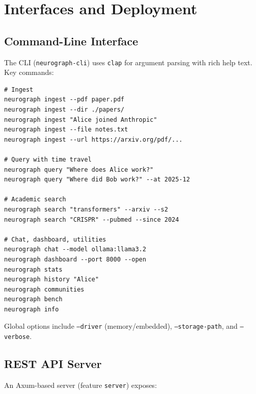 \documentclass[11pt,twocolumn]{article}
\begin{document}
\section{Interfaces and Deployment}
\label{sec:interfaces}

\subsection{Command-Line Interface}

The CLI (\texttt{neurograph-cli}) uses \texttt{clap} for argument parsing with rich help text. Key commands:

\begin{lstlisting}[style=bashcode,caption={CLI usage examples}]
# Ingest
neurograph ingest --pdf paper.pdf
neurograph ingest --dir ./papers/
neurograph ingest "Alice joined Anthropic"
neurograph ingest --file notes.txt
neurograph ingest --url https://arxiv.org/pdf/...

# Query with time travel
neurograph query "Where does Alice work?"
neurograph query "Where did Bob work?" --at 2025-12

# Academic search
neurograph search "transformers" --arxiv --s2
neurograph search "CRISPR" --pubmed --since 2024

# Chat, dashboard, utilities
neurograph chat --model ollama:llama3.2
neurograph dashboard --port 8000 --open
neurograph stats
neurograph history "Alice"
neurograph communities
neurograph bench
neurograph info
\end{lstlisting}

Global options include \texttt{--driver} (memory/embedded), \texttt{--storage-path}, and \texttt{--verbose}.

\subsection{REST API Server}

An Axum-based server (feature \texttt{server}) exposes:
\end{document}
